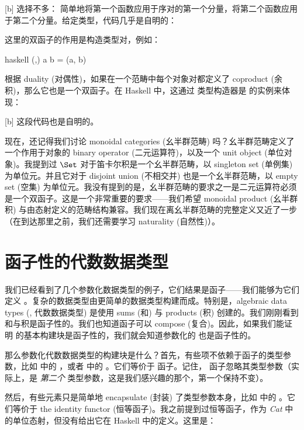 [b]
选择不多： 简单地将第一个函数应用于序对的第一个分量，将第二个函数应用于第二个分量。给定类型，代码几乎是自明的：

这里的双函子的作用是构造类型对，例如：

\begin{snip}{haskell}
(,) a b = (a, b)
\end{snip}
根据 duality (对偶性)，如果在一个范畴中每个对象对都定义了 coproduct (余积)，那么它也是一个双函子。在 Haskell 中，这通过  类型构造器是  的实例来体现：

[b]
这段代码也是自明的。

现在，还记得我们讨论 monoidal categories (幺半群范畴) 吗？幺半群范畴定义了一个作用于对象的 binary operator (二元运算符)，以及一个 unit object (单位对象)。我提到过 $\Set$ 对于笛卡尔积是一个幺半群范畴，以 singleton set (单例集) 为单位元。并且它对于 disjoint union (不相交并) 也是一个幺半群范畴，以 empty set (空集) 为单位元。我没有提到的是，幺半群范畴的要求之一是二元运算符必须是一个双函子。这是一个非常重要的要求——我们希望 monoidal product (幺半群积) 与由态射定义的范畴结构兼容。我们现在离幺半群范畴的完整定义又近了一步（在到达那里之前，我们还需要学习 naturality (自然性)）。

\section{函子性的代数数据类型}

我们已经看到了几个参数化数据类型的例子，它们结果是函子——我们能够为它们定义 。复杂的数据类型由更简单的数据类型构建而成。特别是，algebraic data types (, 代数数据类型) 是使用 sums (和) 与 products (积) 创建的。我们刚刚看到和与积是函子性的。我们也知道函子可以 compose (复合)。因此，如果我们能证明  的基本构建块是函子性的，我们就会知道参数化的  也是函子性的。

那么参数化代数数据类型的构建块是什么？首先，有些项不依赖于函子的类型参数，比如  中的 ，或者  中的 。它们等价于  函子。记住， 函子忽略其类型参数（实际上，是 \emph{第二个} 类型参数，这是我们感兴趣的那个，第一个保持不变）。

然后，有些元素只是简单地 encapsulate (封装) 了类型参数本身，比如  中的 。它们等价于 the identity functor (恒等函子)。我之前提到过恒等函子，作为 \emph{Cat} 中的单位态射，但没有给出它在 Haskell 中的定义。这里是：

